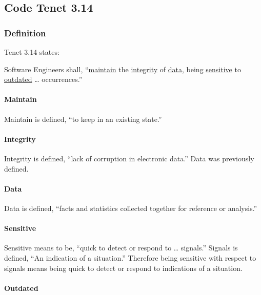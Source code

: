 \documentclass[12pt]{article}
\begin{document}
\begin{multicols}{2}
\subsection{Code Tenet 3.14}

\subsubsection{Definition}

Tenet 3.14 states:

\begin{framed}
Software Engineers shall, “\ul{maintain} the \ul{integrity} of \ul{data}, being \ul{sensitive} to \ul{outdated} … occurrences.”\cite{softwareEngineeringCodeOfEthics}
\end{framed}

\paragraph{Maintain}

Maintain is defined, “to keep in an existing state.”\cite{merriamWebsterDefinitions}

\paragraph{Integrity}

Integrity is defined, “lack of corruption in electronic data.”\cite{oxfordDictionary} Data was previously defined.

\paragraph{Data}

Data is defined, “facts and statistics collected together for reference or analysis.”\cite{dataDefinition}

\paragraph{Sensitive}

Sensitive means to be, “quick to detect or respond to … signals.”\cite{oxfordDictionary} Signals is defined, “An indication of a situation.”\cite{oxfordDictionary} Therefore being sensitive with respect to signals means being quick to detect or respond to indications of a situation.

\paragraph{Outdated}


\end{multicols}
\end{document}
